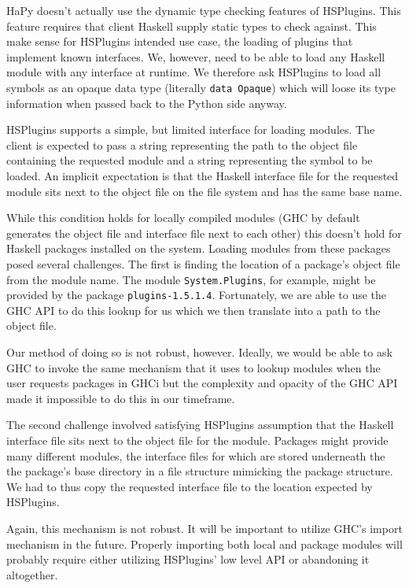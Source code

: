 \documentclass[11pt, letterpaper, oneside, twocolumn] {article}
\begin{document}
HaPy doesn't actually use the dynamic type checking features of HSPlugins. This feature requires that client Haskell supply static types to check against. This make sense for HSPlugins intended use case, the loading of plugins that implement known interfaces. We, however, need to be able to load any Haskell module with any interface at runtime. We therefore ask HSPlugins to load all symbols as an opaque data type (literally \verb!data Opaque!) which will loose its type information when passed back to the Python side anyway.

HSPlugins supports a simple, but limited interface for loading modules. The client is expected to pass a string representing the path to the object file containing the requested module and a string representing the symbol to be loaded. An implicit expectation is that the Haskell interface file for the requested module sits next to the object file on the file system and has the same base name.

While this condition holds for locally compiled modules (GHC by default generates the object file and interface file next to each other) this doesn't hold for Haskell packages installed on the system. Loading modules from these packages posed several challenges. The first is finding the location of a package's object file from the module name. The module \verb!System.Plugins!, for example, might be provided by the package \verb!plugins-1.5.1.4!. Fortunately, we are able to use the GHC API to do this lookup for us which we then translate into a path to the object file.

Our method of doing so is not robust, however. Ideally, we would be able to ask GHC to invoke the same mechanism that it uses to lookup modules when the user requests packages in GHCi but the complexity and opacity of the GHC API made it impossible to do this in our timeframe.

The second challenge involved satisfying HSPlugins assumption that the Haskell interface file sits next to the object file for the module. Packages might provide many different modules, the interface files for which are stored underneath the the package's base directory in a file structure mimicking the package structure. We had to thus copy the requested interface file to the location expected by HSPlugins.

Again, this mechanism is not robust. It will be important to utilize GHC's import mechanism in the future. Properly importing both local and package modules will probably require either utilizing HSPlugins' low level API or abandoning it altogether.
\end{document}
